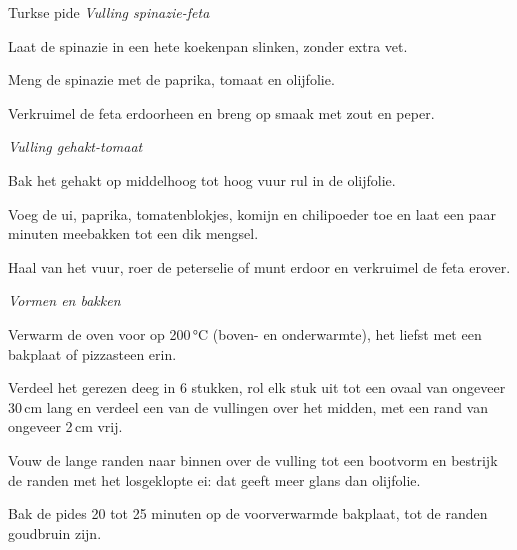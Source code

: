 \begin{recipe}{Turkse pide}
\medskip
\noindent\textit{Vulling spinazie-feta}
\begin{steps}
  \item Laat de spinazie in een hete koekenpan slinken, zonder extra vet.
  \item Meng de spinazie met de paprika, tomaat en olijfolie.
  \item Verkruimel de feta erdoorheen en breng op smaak met zout en peper.
\end{steps}

\medskip
\noindent\textit{Vulling gehakt-tomaat}
\begin{steps}
  \item Bak het gehakt op middelhoog tot hoog vuur rul in de olijfolie.
  \item Voeg de ui, paprika, tomatenblokjes, komijn en chilipoeder toe en laat
        een paar minuten meebakken tot een dik mengsel.
  \item Haal van het vuur, roer de peterselie of munt erdoor en verkruimel de
        feta erover.
\end{steps}

\medskip
\noindent\textit{Vormen en bakken}
\begin{steps}
  \item Verwarm de oven voor op 200\,°C (boven- en onderwarmte), het liefst met een bakplaat of
        pizzasteen erin.
  \item Verdeel het gerezen deeg in 6 stukken, rol elk stuk uit tot een ovaal
        van ongeveer 30\,cm lang en verdeel een van de vullingen over het
        midden, met een rand van ongeveer 2\,cm vrij.
  \item Vouw de lange randen naar binnen over de vulling tot een bootvorm en
        bestrijk de randen met het losgeklopte ei: dat geeft meer glans dan
        olijfolie.
  \item Bak de pides 20 tot 25 minuten op de voorverwarmde bakplaat, tot de
        randen goudbruin zijn.
\end{steps}
\end{recipe}
